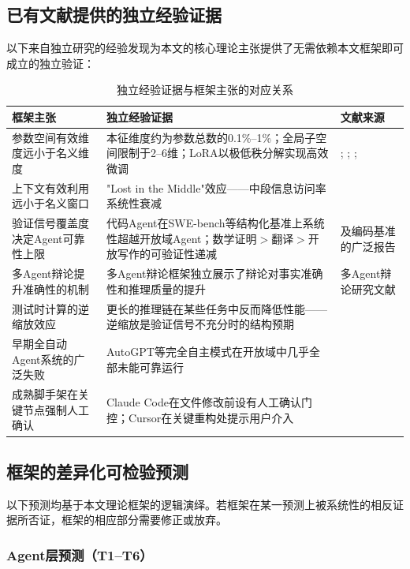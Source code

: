 \documentclass[11pt,a4paper]{article}
\theoremstyle{definition}
\begin{document}
\subsection{已有文献提供的独立经验证据}

以下来自独立研究的经验发现为本文的核心理论主张提供了无需依赖本文框架即可成立的独立验证：

\begin{table}[H]
\centering
\caption{独立经验证据与框架主张的对应关系}
\begin{tabular}{@{}p{4cm}p{5cm}p{4cm}@{}}
\toprule
\textbf{框架主张} & \textbf{独立经验证据} & \textbf{文献来源} \\
\midrule
参数空间有效维度远小于名义维度 & 本征维度约为参数总数的0.1\%--1\%；全局子空间限制于2--6维；LoRA以极低秩分解实现高效微调 & \cite{li2018intrinsic}; \cite{aghajanyan2020intrinsic}; \cite{hu2021lora}; \cite{xu2026parameter} \\
上下文有效利用远小于名义窗口 & "Lost in the Middle"效应——中段信息访问率系统性衰减 & \cite{liu2023lost} \\
验证信号覆盖度决定Agent可靠性上限 & 代码Agent在SWE-bench等结构化基准上系统性超越开放域Agent；数学证明$>$翻译$>$开放写作的可验证性递减 & \cite{claude_code_2025}及编码基准的广泛报告 \\
多Agent辩论提升准确性的机制 & 多Agent辩论框架独立展示了辩论对事实准确性和推理质量的提升 & 多Agent辩论研究文献 \\
测试时计算的逆缩放效应 & 更长的推理链在某些任务中反而降低性能——逆缩放是验证信号不充分时的结构预期 & \cite{gema2025inverse} \\
早期全自动Agent系统的广泛失败 & AutoGPT等完全自主模式在开放域中几乎全部未能可靠运行 & \cite{autogpt_failure_2024} \\
成熟脚手架在关键节点强制人工确认 & Claude Code在文件修改前设有人工确认门控；Cursor在关键重构处提示用户介入 & \cite{claude_code_2025} \\
\bottomrule
\end{tabular}
\end{table}

\subsection{框架的差异化可检验预测}
\label{sec:predictions}

以下预测均基于本文理论框架的逻辑演绎。若框架在某一预测上被系统性的相反证据所否证，框架的相应部分需要修正或放弃。

\subsubsection{Agent层预测（T1--T6）}
\end{document}
